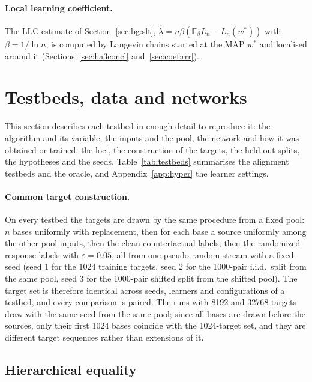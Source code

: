 \documentclass[11pt,a4paper]{article}
\begin{document}
\paragraph{Local learning coefficient.} The LLC estimate of Section~\ref{sec:bg:slt}, $\hat\lambda=n\beta(\mathbb E_\beta L_n-L_n(w^*))$ with $\beta=1/\ln n$, is computed by Langevin chains started at the MAP $w^*$ and localised around it (Sections~\ref{sec:ha3concl} and~\ref{sec:coef:rrr}).

\section{Testbeds, data and networks}
\label{sec:testbeds}

This section describes each testbed in enough detail to reproduce it: the algorithm and its variable, the inputs and the pool, the network and how it was obtained or trained, the loci, the construction of the targets, the held-out splits, the hypotheses and the seeds. Table~\ref{tab:testbeds} summarises the alignment testbeds and the oracle, and Appendix~\ref{app:hyper} the learner settings.

\paragraph{Common target construction.} On every testbed the targets are drawn by the same procedure from a fixed pool: $n$ bases uniformly with replacement, then for each base a source uniformly among the other pool inputs, then the clean counterfactual labels, then the randomized-response labels with $\varepsilon=0.05$, all from one pseudo-random stream with a fixed seed (seed 1 for the 1024 training targets, seed 2 for the 1000-pair i.i.d.\ split from the same pool, seed 3 for the 1000-pair shifted split from the shifted pool). The target set is therefore identical across seeds, learners and configurations of a testbed, and every comparison is paired. The runs with 8192 and 32768 targets draw with the same seed from the same pool; since all bases are drawn before the sources, only their first 1024 bases coincide with the 1024-target set, and they are different target sequences rather than extensions of it.

\subsection{Hierarchical equality}
\label{sec:tb:heq}
\end{document}
